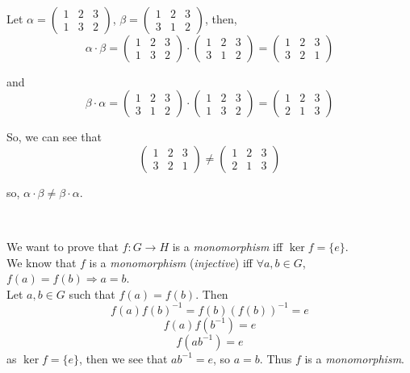 \documentclass{article}
\theoremstyle{definition}
\newenvironment{solution}[1]
{\renewcommand\theinnersolution{#1}\innersolution}
{\endinnersolution}
\begin{document}
\begin{solution}{2.5}\

	Let $\alpha = (\begin{smallmatrix}1 & 2 & 3\\ 1 & 3 & 2\end{smallmatrix})$, $\beta = (\begin{smallmatrix}1 & 2 & 3\\ 3 & 1 & 2\end{smallmatrix})$, then,
	$$
	\alpha \cdot \beta = 
	(\begin{smallmatrix}1 & 2 & 3\\ 1 & 3 & 2\end{smallmatrix})
	\cdot (\begin{smallmatrix}1 & 2 & 3\\ 3 & 1 & 2\end{smallmatrix})
	= (\begin{smallmatrix}1 & 2 & 3\\ 3 & 2 & 1\end{smallmatrix})
	$$

	and
	$$
	\beta \cdot \alpha = 
	(\begin{smallmatrix}1 & 2 & 3\\ 3 & 1 & 2\end{smallmatrix}) \cdot
	(\begin{smallmatrix}1 & 2 & 3\\ 1 & 3 & 2\end{smallmatrix})
	= (\begin{smallmatrix}1 & 2 & 3\\ 2 & 1 & 3\end{smallmatrix})
	$$

	So, we can see that
	$$
	(\begin{smallmatrix}1 & 2 & 3\\ 3 & 2 & 1\end{smallmatrix})
	\neq
	(\begin{smallmatrix}1 & 2 & 3\\ 2 & 1 & 3\end{smallmatrix})
	$$

	so, $\alpha \cdot \beta \neq \beta \cdot \alpha$.
\end{solution}

\begin{solution}{2.26}\

	We want to prove that $f: G \rightarrow H$ is a \emph{monomorphism} iff $\ker f=\{e\}$.\\
	We know that $f$ is a \emph{monomorphism} (\emph{injective}) iff $\forall a, b \in G$, $f(a) = f(b) \Rightarrow a = b$.\\
	Let $a, b \in G$ such that $f(a)=f(b)$. Then
	$$f(a) f(b)^{-1} = f(b) (f(b))^{-1} = e$$
	$$f(a) f(b^{-1}) = e$$
	$$f(ab^{-1}) = e$$
	as $\ker f = \{e\}$, then we see that $ab^{-1}=e$, so $a=b$. Thus $f$ is a \emph{monomorphism}.
\end{solution}
\end{document}

